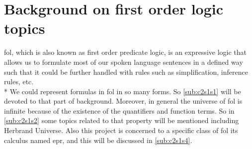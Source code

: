 \section{Background on first order logic topics} \label{sec:c2s1}

\ac{fol}, which is also known as first order predicate logic, is an expressive logic that allows us to formulate most of our spoken language sentences in a defined way such that it could be further handled with rules such as simplification, inference rules, etc.\\*
We could represent formulas in \ac{fol} in so many forms. So \ref{sub:c2s1s1} will be devoted to that part of background.\newline
Moreover, in general the universe of \ac{fol} is infinite because of the existence of the quantifiers and function terms. So in \ref{sub:c2s1s2} some topics related to that property will be mentioned including Herbrand Universe.\newline    
Also this project is concerned to a specific class of \ac{fol} its calculus named \ac{epr}, and this will be discussed in \ref{sub:c2s1s4}.








   